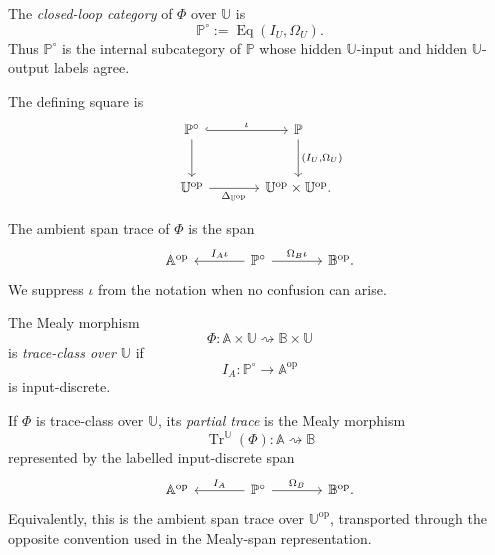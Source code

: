 \begin{definition}
\label{def:closed-loop-category}
The \emph{closed-loop category} of \(\Phi\) over \(\mathbb U\) is
\[
\mathbb P^\circ
:=
\operatorname{Eq}(I_U,\Omega_U).
\]
Thus \(\mathbb P^\circ\) is the internal subcategory of \(\mathbb P\) whose
hidden \(\mathbb U\)-input and hidden \(\mathbb U\)-output labels agree.
\end{definition}

The defining square is
\[
\begin{tikzcd}[column sep=large,row sep=large]
\mathbb P^\circ
  \arrow[r, hook, "\iota"]
  \arrow[d]
&
\mathbb P
  \arrow[d, "{(I_U,\Omega_U)}"]
\\
\mathbb U^{\mathrm{op}}
  \arrow[r, "\Delta_{\mathbb U^{\mathrm{op}}}"']
&
\mathbb U^{\mathrm{op}}\times\mathbb U^{\mathrm{op}} .
\end{tikzcd}
\]

The ambient span trace of \(\Phi\) is the span
\[
\begin{tikzcd}[column sep=large]
\mathbb A^{\mathrm{op}}
&
\mathbb P^\circ
  \arrow[l, "I_A\iota"']
  \arrow[r, "\Omega_B\iota"]
&
\mathbb B^{\mathrm{op}} .
\end{tikzcd}
\]
We suppress \(\iota\) from the notation when no confusion can arise.

\begin{definition}
\label{def:trace-class-mealy}
The Mealy morphism
\[
\Phi:
\mathbb A\times\mathbb U
\rightsquigarrow
\mathbb B\times\mathbb U
\]
is \emph{trace-class over \(\mathbb U\)} if
\[
I_A:\mathbb P^\circ\to\mathbb A^{\mathrm{op}}
\]
is input-discrete.
\end{definition}

\begin{definition}
\label{def:partial-trace-mealy}
If \(\Phi\) is trace-class over \(\mathbb U\), its \emph{partial trace} is the
Mealy morphism
\[
\operatorname{Tr}^{\mathbb U}(\Phi):
\mathbb A\rightsquigarrow\mathbb B
\]
represented by the labelled input-discrete span
\[
\begin{tikzcd}[column sep=large]
\mathbb A^{\mathrm{op}}
&
\mathbb P^\circ
  \arrow[l, "I_A"']
  \arrow[r, "\Omega_B"]
&
\mathbb B^{\mathrm{op}} .
\end{tikzcd}
\]
Equivalently, this is the ambient span trace over
\(\mathbb U^{\mathrm{op}}\), transported through the opposite convention used
in the Mealy-span representation.
\end{definition}

